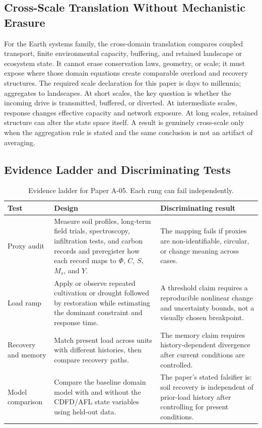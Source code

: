 \documentclass[11pt,a4paper]{article}
\begin{document}
\subsection{Cross-Scale Translation Without Mechanistic Erasure}

For the Earth systems family, the cross-domain translation compares coupled transport, finite environmental capacity, buffering, and retained landscape or ecosystem state. It cannot erase conservation laws, geometry, or scale; it must expose where those domain equations create comparable overload and recovery structures. \cite{Holling1973,Turing1952,BakTangWiesenfeld1987}
The required scale declaration for this paper is days to millennia; aggregates to landscapes. At short
scales, the key question is whether the incoming drive is transmitted,
buffered, or diverted. At intermediate scales, response changes effective
capacity and network exposure. At long scales, retained structure can alter the
state space itself. A result is genuinely cross-scale only when the aggregation
rule is stated and the same conclusion is not an artifact of averaging.

\subsection{Evidence Ladder and Discriminating Tests}

\begin{table}[htbp]
\centering
\small
\caption{Evidence ladder for Paper A-05. Each rung can fail independently.}
\begin{tabularx}{\textwidth}{|p{}|X|X|}
\hline
\textbf{Test} & \textbf{Design} & \textbf{Discriminating result} \\
\hline
Proxy audit & Measure soil profiles, long-term field trials, spectroscopy, infiltration tests, and carbon records and preregister how each record maps to $\Phi$, $C$, $S$, $M_s$, and $Y$. & The mapping fails if proxies are non-identifiable, circular, or change meaning across cases. \\
\hline
Load ramp & Apply or observe repeated cultivation or drought followed by restoration while estimating the dominant constraint and response time. & A threshold claim requires a reproducible nonlinear change and uncertainty bounds, not a visually chosen breakpoint. \\
\hline
Recovery and memory & Match present load across units with different histories, then compare recovery paths. & The memory claim requires history-dependent divergence after current conditions are controlled. \\
\hline
Model comparison & Compare the baseline domain model with and without the CDFD/AFL state variables using held-out data. & The paper's stated falsifier is: soil recovery is independent of prior-load history after controlling for present conditions. \\
\hline
\end{tabularx}
\end{table}
\end{document}
